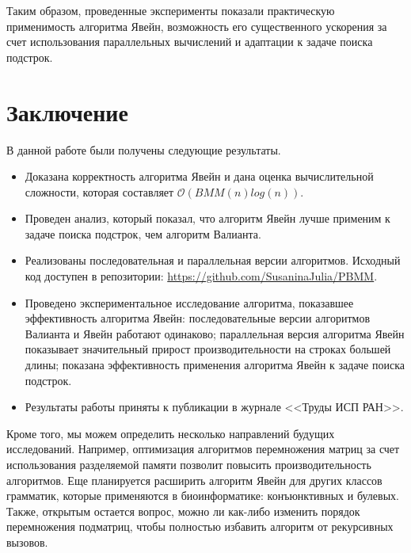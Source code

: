 Таким образом, проведенные эксперименты показали практическую применимость алгоритма Явейн, возможность его существенного ускорения за счет использования параллельных вычислений и адаптации к задаче поиска подстрок.

\section{Заключение}
В данной работе были получены следующие результаты.

\begin{itemize}
	\item Доказана корректность алгоритма Явейн и дана оценка вычислительной сложности, которая составляет $\mathcal{O}(BMM(n)log(n))$.
	\item Проведен анализ, который показал, что алгоритм Явейн лучше применим к задаче поиска подстрок, чем алгоритм Валианта.
	\item Реализованы последовательная и параллельная версии алгоритмов. Исходный код доступен в репозитории: \url{https://github.com/SusaninaJulia/PBMM}.
	\item Проведено экспериментальное исследование алгоритма, показавшее эффективность алгоритма Явейн: последовательные версии алгоритмов Валианта и Явейн работают одинаково; параллельная версия алгоритма Явейн показывает значительный прирост производительности на строках большей длины; показана эффективность применения алгоритма Явейн к задаче поиска подстрок.
	\item Результаты работы приняты к публикации в журнале <<Труды ИСП РАН>>.
\end{itemize}

Кроме того, мы можем определить несколько направлений будущих исследований.
Например, оптимизация алгоритмов перемножения матриц за счет использования разделяемой памяти позволит повысить производительность алгоритмов.
Еще планируется расширить алгоритм Явейн для других классов грамматик, которые применяются в биоинформатике: конъюнктивных и булевых.
Также, открытым остается вопрос, можно ли как-либо изменить порядок перемножения подматриц, чтобы полностью избавить алгоритм от рекурсивных вызовов.


